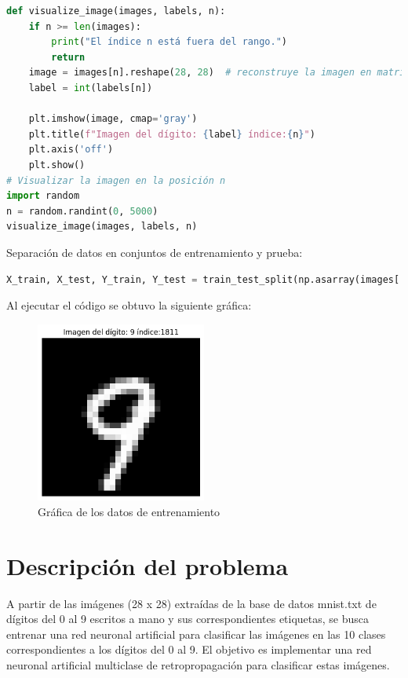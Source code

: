 \documentclass{article}
\begin{document}
    \begin{lstlisting}[language=Python, caption={Visualización de datos}, label={lst:visualize_data}]
def visualize_image(images, labels, n):
    if n >= len(images):
        print("El índice n está fuera del rango.")
        return
    image = images[n].reshape(28, 28)  # reconstruye la imagen en matriz de 28x28
    label = int(labels[n])

    plt.imshow(image, cmap='gray')
    plt.title(f"Imagen del dígito: {label} índice:{n}")
    plt.axis('off')
    plt.show()
# Visualizar la imagen en la posición n
import random
n = random.randint(0, 5000)
visualize_image(images, labels, n)
    \end{lstlisting}

    \noindent
    Separación de datos en conjuntos de entrenamiento y prueba:
    \begin{lstlisting}[language=Python, caption={Separación de datos}, label={lst:split_data}]
X_train, X_test, Y_train, Y_test = train_test_split(np.asarray(images[:1000]), labels[:1000], test_size=0.1, shuffle=True)
    \end{lstlisting}

    \clearpage
    \noindent
    Al ejecutar el código se obtuvo la siguiente gráfica:
    \begin{figure}[h]
        \centering
        \includegraphics[width=0.5\textwidth]{img/ramdom_mnist}
        \caption{Gráfica de los datos de entrenamiento}
        \label{fig:random_mnist}
    \end{figure}

    \clearpage


    \section{Descripción del problema}\label{sec:descripcion-del-problema}
    A partir de las imágenes (28 x 28) extraídas de la base de datos mnist.txt de dígitos del 0 al 9 escritos a mano y sus correspondientes etiquetas,
    se busca entrenar una red neuronal artificial para clasificar las imágenes en las 10 clases correspondientes a los dígitos del 0 al 9.
    El objetivo es implementar una red neuronal artificial multiclase de retropropagación para clasificar estas imágenes.
\end{document}
